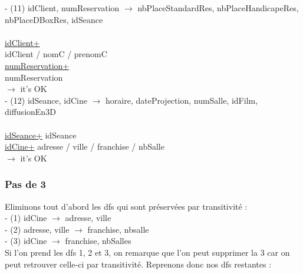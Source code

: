 \documentclass[a4paper,sffamily,12pt]{article}
\begin{document}
				\noindent - (11) idClient, numReservation $\rightarrow$ nbPlaceStandardRes, nbPlaceHandicapeRes, nbPlaceDBoxRes, idSeance \\
					\\
					\underline{idClient+} \\
					idClient / nomC / prenomC \\
					\underline{numReservation+} \\
					numReservation \\	
				$\rightarrow$ it's OK \\					
				
				\noindent - (12) idSeance, idCine $\rightarrow$ horaire, dateProjection, numSalle, idFilm, diffusionEn3D \\												
					\\
					\underline{idSeance+}
					idSeance \\
					\underline{idCine+}
					adresse / ville / franchise / nbSalle \\
				$\rightarrow$ it's OK \\

				\vspace{0.5cm}

			\subsubsection{Pas de 3}		
	
				\vspace{0.5cm}
	
				\noindent Eliminons tout d'abord les dfs qui sont préservées par transitivité : \\
	
					\noindent- (1) idCine $\rightarrow$ adresse, ville \\
					- (2) adresse, ville $\rightarrow$ franchise, nbsalle \\
					- (3) idCine $\rightarrow$ franchise, nbSalles \\
					
				Si l'on prend les dfs 1, 2 et 3, on remarque que l'on peut supprimer la 3 car on peut retrouver celle-ci par transitivité. Reprenons donc nos dfs restantes : \\
					
\end{document}
